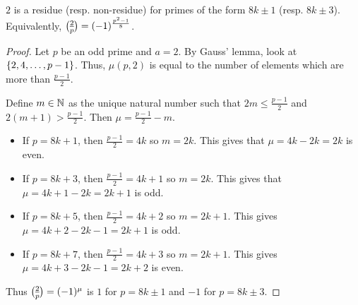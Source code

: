 \begin{proposition}
    $2$ is a residue (resp. non-residue) for primes of the form $8k \pm 1$
    (resp. $8k \pm 3$).
    Equivalently, $\lgnd 2 p = (-1)^{\frac{p^2 - 1}{8}}$.
\end{proposition}
\begin{proof}
    Let $p$ be an odd prime and $a = 2$.
    By Gauss' lemma, look at $\set{2, 4, \dots, p-1}$.
    Thus, $\mu(p, 2)$ is equal to the number of elements which are more than
    $\frac{p-1}{2}$.

    Define $m \in \mathbb{N}$ as the unique natural number such that
    $2m \le \frac{p-1}{2}$ and $2(m + 1) > \frac{p-1}{2}$.
    Then $\mu = \frac{p-1}{2} - m$.
    \begin{itemize}
        \item If $p = 8k + 1$, then $\frac{p-1}{2} = 4k$ so $m = 2k$.
        This gives that $\mu = 4k - 2k = 2k$ is even.
        \item If $p = 8k + 3$, then $\frac{p-1}{2} = 4k + 1$ so $m = 2k$.
        This gives that $\mu = 4k + 1 - 2k = 2k + 1$ is odd.
        \item If $p = 8k + 5$, then $\frac{p-1}{2} = 4k+2$ so $m = 2k+1$.
        This gives $\mu = 4k+2 - 2k - 1 = 2k + 1$ is odd.
        \item If $p = 8k + 7$, then $\frac{p-1}{2} = 4k + 3$ so $m = 2k+1$.
        This gives $\mu = 4k+3 - 2k - 1 = 2k + 2$ is even.
    \end{itemize}
    Thus $\lgnd 2 p = (-1)^\mu$ is $1$ for $p = 8k \pm 1$ and $-1$ for
    $p = 8k \pm 3$.
\end{proof}

